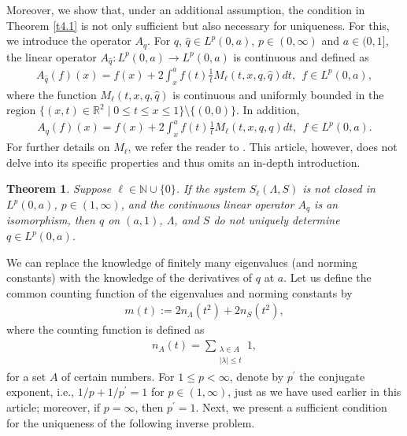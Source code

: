 \documentclass[reqno,12pt,centertags]{amsart}
\numberwithin{equation}{section}
\newtheorem{theorem}{Theorem}[section]
\theoremstyle{definition}
\begin{document}
Moreover, we show that, under an additional assumption, the condition in Theorem \ref{t4.1} is not only sufficient but also necessary for uniqueness. For this, we introduce the operator $A_{q}$.
For $q$, $\hat{q}\in L^{p}(0,a)$, $p\in(0,\infty)$ and $a\in(0,1]$,
the linear operator $A_{\hat{q}}: L^p(0, a) \rightarrow L^p(0, a)$ is continuous and defined as
\begin{align}\label{l3.8}
A_{\hat{q}}(f)(x)
=f(x)+2 \int_{x}^{a} f(t) \frac{1}{t} M_{\ell}(t, x, q, \hat{q})dt,  
~~f\in L^p(0, a),
\end{align}
where the function $M_{\ell}(t, x, q, \hat{q})$ is continuous and uniformly bounded in the region 
$\{(x, t) \in \mathbb{R}^2 \mid 0 \leq t \leq x \leq 1\} \setminus\{(0,0)\}$. 
In addition,
\begin{align*}
A_{q}(f)(x)
=f(x)+2 \int_{x}^{a} f(t) \frac{1}{t} M_{\ell}(t, x, q, q)dt,  
~~f\in L^p(0, a).
\end{align*}
For further details on $M_{\ell}$, we refer the reader to \cite{XYB2023}. This article, however, does not delve into its specific properties and thus omits an in-depth introduction.

\begin{theorem}\label{t4.2}
Suppose $\ell\in \mathbb{N}\cup\{0\}$.
If the system $S_{\ell}(\Lambda,S)$ is not closed in $L^p(0, a)$, $p\in(1,\infty)$, and the continuous linear operator $A_q$ is an isomorphism, then $q$ on $(a,1)$, $\Lambda$, and $S$ do not uniquely determine $q \in L^p(0, a)$.
\end{theorem}




We can replace the knowledge of finitely many eigenvalues (and norming constants) with the knowledge of the derivatives of $q$ at $a$. Let us define the common counting function of the eigenvalues and norming constants by
\begin{align*}
m(t):=2n_{\Lambda}(t^2)+2n_{S}(t^2),
\end{align*}
where the counting function is defined as
\begin{align*}
n_{A}(t)
=\sum_{\substack{\lambda\in A \\ |\lambda|\leq t}}1,
\end{align*}
for a set $A$ of certain numbers. 
For $1\leq p<\infty$, denote by $p^{\prime}$ the conjugate exponent, i.e., $1/p+1/p^{\prime}=1$ for $p\in(1,\infty)$, just as we have used earlier in this article; moreover, if $p=\infty$, then $p^{\prime}=1$.
Next, we present a sufficient condition for the uniqueness of the following inverse problem.
\end{document}
